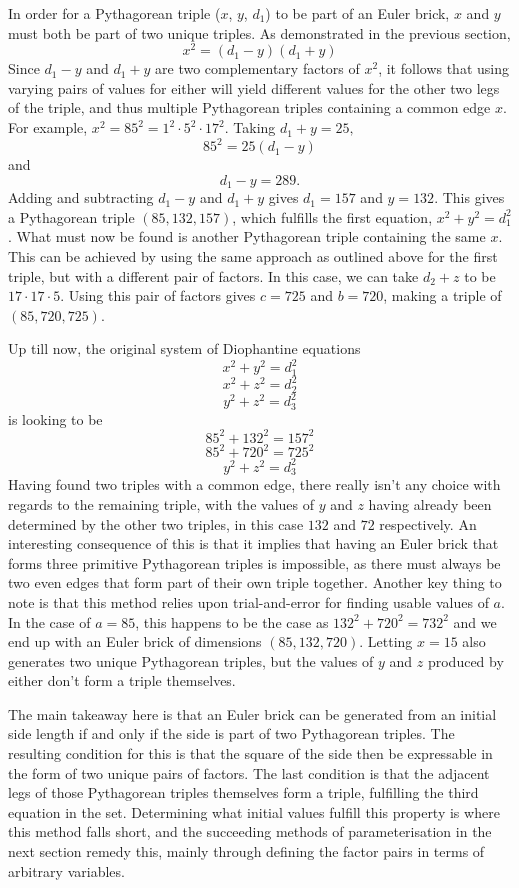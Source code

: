 \documentclass[11pt]{article}
\begin{document}
In order for a Pythagorean triple ($x$, $y$, $d_1$) to be part of an Euler brick, $x$ and $y$ must both be part of two unique triples. As demonstrated in the previous section,
$$x^2=(d_1-y)(d_1+y)$$
Since $d_1-y$ and $d_1+y$ are two complementary factors of $x^2$, it follows that using varying pairs of values for either will yield different values for the other two legs of the triple, and thus multiple Pythagorean triples containing a common edge $x$. For example, $x^2=85^2=1^2\cdot{5}^2\cdot{17}^2$. Taking $d_1+y=25,$
$$85^2=25(d_1-y)$$
and $$d_1-y=289.$$
Adding and subtracting $d_1-y$ and $d_1+y$ gives $d_1=157$ and $y=132$. This gives a Pythagorean triple $(85, 132, 157)$, which fulfills the first equation, $x^2+y^2=d_1^2$. What must now be found is another Pythagorean triple containing the same $x$. This can be achieved by using the same approach as outlined above for the first triple, but with a different pair of factors. In this case, we can take $d_2+z$ to be $17\cdot{17}\cdot{5}$. Using this pair of factors gives $c=725$ and $b=720$, making a triple of $(85, 720, 725)$.

Up till now, the original system of Diophantine equations
$$x^2+y^2=d_1^2$$
$$x^2+z^2=d_2^2$$
$$y^2+z^2=d_3^2$$
is looking to be
$$85^2+132^2=157^2$$
$$85^2+720^2=725^2$$
$$y^2+z^2=d_3^2$$
Having found two triples with a common edge, there really isn't any choice with regards to the remaining triple, with the values of $y$ and $z$ having already been determined by the other two triples, in this case $132$ and $72$ respectively. An interesting consequence of this is that it implies that having an Euler brick that forms three primitive Pythagorean triples is impossible, as there must always be two even edges that form part of their own triple together. Another key thing to note is that this method relies upon trial-and-error for finding usable values of $a$. In the case of $a=85$, this happens to be the case as $132^2+720^2=732^2$ and we end up with an Euler brick of dimensions $(85, 132, 720)$. Letting $x=15$ also generates two unique Pythagorean triples, but the values of $y$ and $z$ produced by either don't form a triple themselves. 

The main takeaway here is that an Euler brick can be generated from an initial side length if and only if the side is part of two Pythagorean triples. The resulting condition for this is that the square of the side then be expressable in the form of two unique pairs of factors. The last condition is that the adjacent legs of those Pythagorean triples themselves form a triple, fulfilling the third equation in the set. Determining what initial values fulfill this property is where this method falls short, and the succeeding methods of parameterisation in the next section remedy this, mainly through defining the factor pairs in terms of arbitrary variables.
\end{document}
